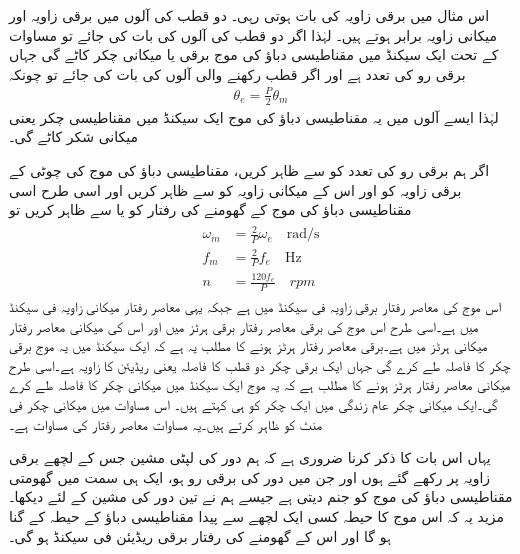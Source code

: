 اس مثال میں برقی زاویہ کی بات ہوتی رہی۔ دو قطب کی آلوں میں برقی زاویہ   اور میکانی زاویہ  برابر ہوتے ہیں۔ لہٰذا اگر دو قطب کی آلوں کی بات کی جائے تو مساوات  کے تحت ایک سیکنڈ میں مقناطیسی دباؤ کی موج  برقی یا میکانی چکر کاٹے گی جہاں  برقی رو کی تعدد ہے اور اگر  قطب رکھنے والی آلوں کی بات کی جائے تو چونکہ
\begin{align}
\theta_e=\frac{P}{2} \theta_m
\end{align}
لہٰذا ایسے آلوں میں یہ مقناطیسی دباؤ کی موج ایک سیکنڈ میں  مقناطیسی چکر یعنی  میکانی شکر کاٹے گی۔

اگر ہم برقی رو کی تعدد کو  سے ظاہر کریں، مقناطیسی دباؤ کی موج کی چوٹی کے برقی زاویہ کو   اور اس کے میکانی زاویہ کو  سے ظاہر کریں اور اسی طرح اسی مقناطیسی دباؤ کی موج کے گھومنے کی رفتار کو  یا  سے ظاہر کریں تو
\begin{gather}
\begin{aligned}
\omega_m&=\frac{2}{P} \omega_e \quad \si{\radian / \second}\\
f_m&=\frac{2}{P} f_e \quad \si{\hertz}\\
n&=\frac{120 f_e}{P} \quad rpm
\end{aligned}
\end{gather}
 اس موج کی معاصر رفتار  برقی زاویہ فی سیکنڈ میں ہے جبکہ   یہی معاصر رفتار میکانی زاویہ فی سیکنڈ میں ہے۔اسی طرح  اس موج کی برقی  معاصر رفتار برقی ہرٹز میں اور  اس کی میکانی معاصر رفتار میکانی ہرٹز میں ہے۔برقی معاصر رفتار   ہرٹز ہونے کا مطلب یہ ہے کہ ایک سیکنڈ میں یہ موج  برقی چکر کا فاصلہ طے کرے گی جہاں ایک برقی چکر دو قطب کا فاصلہ یعنی   ریڈیئن کا زاویہ ہے۔اسی طرح میکانی معاصر رفتار  ہرٹز ہونے کا مطلب ہے کہ یہ موج ایک سیکنڈ میں  میکانی چکر کا فاصلہ طے کرے گی۔ایک میکانی چکر عام زندگی میں ایک چکر کو ہی کہتے ہیں۔ اس مساوات میں  میکانی چکر فی منٹ  کو ظاہر کرتے ہیں۔یہ مساوات معاصر رفتار کی مساوات ہے۔

یہاں اس بات کا ذکر کرنا ضروری ہے کہ ہم  دور کی لپٹی مشین جس کے لچھے  برقی زاویہ پر رکھے گئے ہوں اور جن میں  دور کی برقی رو  ہو، ایک ہی سمت میں گھومتی مقناطیسی دباؤ کی موج کو جنم دیتی ہے جیسے ہم نے تین دور کی مشین کے لئے دیکھا۔ مزید یہ کہ اس موج کا حیطہ کسی ایک لچھے سے پیدا مقناطیسی دباؤ کے حیطہ  کے   گنا ہو گا اور اس کے گھومنے کی رفتار  برقی ریڈیئن فی سیکنڈ ہو گی۔

